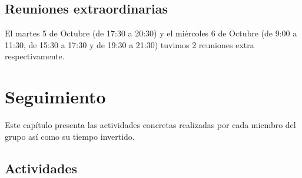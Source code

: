 \documentclass[11 pt]{book}
\begin{document}
	\section*{Reuniones extraordinarias}
		El martes 5 de Octubre (de 17:30 a 20:30) y el miércoles 6 de Octubre (de 9:00 a 11:30, de 15:30 a 17:30 y de 19:30 a 21:30) tuvimos 2 reuniones extra respectivamente.

\chapter{Seguimiento}
	Este capítulo presenta las actividades concretas realizadas por cada miembro del grupo así como su tiempo invertido.
	
	\section*{Actividades}
\end{document}
